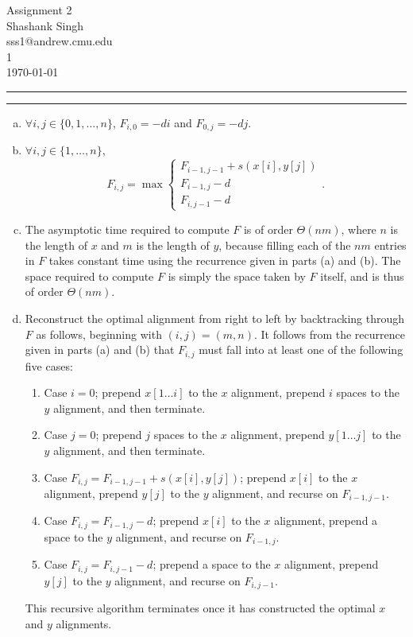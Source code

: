 \documentclass[11pt]{article}
\makeatletter
\newcounter{questionCounter}
\newcounter{partCounter}[questionCounter]
\newenvironment{question}[2][\arabic{questionCounter}]{%
    \setcounter{partCounter}{0}%
    \vspace{.25in} \hrule \vspace{0.5em}%
        \noindent{\bf #2}%
    \vspace{0.8em} \hrule \vspace{.10in}%
    \addtocounter{questionCounter}{1}%
}{}
\newcommand{\myname}{Shashank Singh}
\newcommand{\myandrew}{sss1@andrew.cmu.edu}
\newcommand{\myhwname}{Assignment 2}
\newcommand{\myrecitation}{1}
\makeatother
\begin{document}
\thispagestyle{plain}

\begin{center}
{\Large \myhwname} \\
\myname \\
\myandrew \\
\myrecitation \\
\today
\end{center}
\begin{question}{Sequence Alignment}
\begin{enumerate}[(a)]
\item $\forall i,j \in \{0,1, \ldots, n\}$, $F_{i,0} = -di$ and $F_{0,j} = -dj$.

\item $\forall i, j \in \{1, \ldots, n\}$,
\[
   F_{i,j} = \max \left\{
     \begin{array}{l}
       F_{i - 1,j - 1} + s(x[i],y[j])\\
       F_{i - 1, j} - d \\
       F_{i, j - 1} - d
     \end{array}.
   \right.
\]

\item The asymptotic time required to compute $F$ is of order $\Theta(nm)$,
where $n$ is the length of $x$ and $m$ is the length of $y$, because
filling each of the $nm$ entries in $F$ takes constant time using the
recurrence given in parts (a) and (b). The space required to compute $F$ is
simply the space taken by $F$ itself, and is thus of order $\Theta(nm)$.

\item Reconstruct the optimal alignment from right to left by backtracking
through $F$ as follows, beginning with $(i,j) = (m,n)$. It follows from the
recurrence given in parts (a) and (b) that $F_{i,j}$ must fall into at least
one of the following five cases:
\begin{enumerate}[1.]
\item Case $i = 0$; prepend $x[1\ldots i]$ to the $x$ alignment, prepend $i$
spaces to the $y$ alignment, and then terminate.
\item Case $j = 0$; prepend $j$ spaces to the $x$ alignment, prepend $y[1\ldots j]$
to the $y$ alignment, and then terminate.
\item Case $F_{i,j} = F_{i - 1,j - 1} + s(x[i],y[j])$; prepend $x[i]$ to the
$x$ alignment, prepend $y[j]$ to the $y$ alignment, and recurse on
$F_{i - 1,j - 1}$.
\item Case $F_{i,j} = F_{i - 1,j} - d$; prepend $x[i]$ to the $x$ alignment,
prepend a space to the $y$ alignment, and recurse on $F_{i - 1, j}$.
\item Case $F_{i,j} = F_{i,j - 1} - d$; prepend a space to the $x$ alignment,
prepend $y[j]$ to the $y$ alignment, and recurse on $F_{i,j - 1}$.
\end{enumerate}
This recursive algorithm terminates once it has constructed the optimal $x$
and $y$ alignments.
\end{enumerate}
\end{question}
\end{document}
